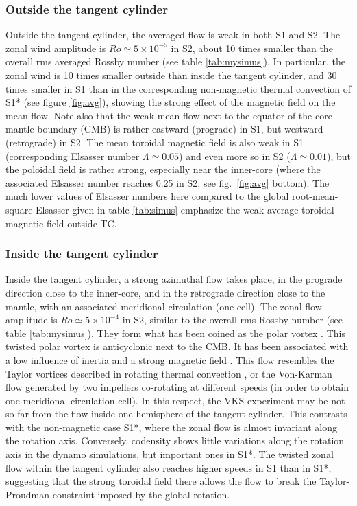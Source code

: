 \documentclass[12pt, a4paper]{article}
\begin{document}
\subsubsection{Outside the tangent cylinder}
Outside the tangent cylinder, the averaged flow is weak in both S1 and S2.
The zonal wind amplitude is $Ro \simeq 5 \times 10^{-5}$ in S2, about 10 times smaller than the overall rms averaged Rossby number (see table \ref{tab:mysimus}).
In particular, the zonal wind is 10 times smaller outside than inside the tangent cylinder, and 30 times smaller in S1 than in the corresponding non-magnetic thermal convection of S1* (see figure \ref{fig:avg}), showing the strong effect of the magnetic field on the mean flow.
Note also that the weak mean flow next to the equator of the core-mantle boundary (CMB) is rather eastward (prograde) in S1, but westward (retrograde) in S2.
The mean toroidal magnetic field is also weak in S1 (corresponding Elsasser number $\Lambda \simeq 0.05$) and even more so in S2 ($\Lambda \simeq 0.01$), but the poloidal field is rather strong, especially near the inner-core (where the associated Elsasser number reaches 0.25 in S2, see fig.~\ref{fig:avg} bottom).
The much lower values of Elsasser numbers here compared to the global root-mean-square Elsasser given in table \ref{tab:simus} emphasize the weak average toroidal magnetic field outside TC.

\subsubsection{Inside the tangent cylinder}
Inside the tangent cylinder, a strong azimuthal flow takes place, in the prograde direction close to the inner-core, and in the retrograde direction close to the mantle, with an associated meridional circulation (one cell).
The zonal flow amplitude is $Ro \simeq 5 \times 10^{-4}$ in S2, similar to the overall rms Rossby number (see table \ref{tab:mysimus}).
They form what has been coined as the polar vortex \citep{olson1999,aubert2005}.
This twisted polar vortex is anticyclonic next to the CMB.
It has been associated with a low influence of inertia and a strong magnetic field \citep{sreenivasan2006}.
This flow resembles the Taylor vortices described in rotating thermal convection \citep[e.g.][]{grooms2010}, or the Von-Karman flow generated by two impellers co-rotating at different speeds (in order to obtain one meridional circulation cell).
In this respect, the VKS experiment \citep{monchaux2009} may be not so far from the flow inside one hemisphere of the tangent cylinder.
This contrasts with the non-magnetic case S1*, where the zonal flow is almost invariant along the rotation axis.
Conversely, codensity shows little variations along the rotation axis in the dynamo simulations, but important ones in S1*.
The twisted zonal flow within the tangent cylinder also reaches higher speeds in S1 than in S1*, suggesting that the strong toroidal field there allows the flow to break the Taylor-Proudman constraint imposed by the global rotation.
\end{document}
